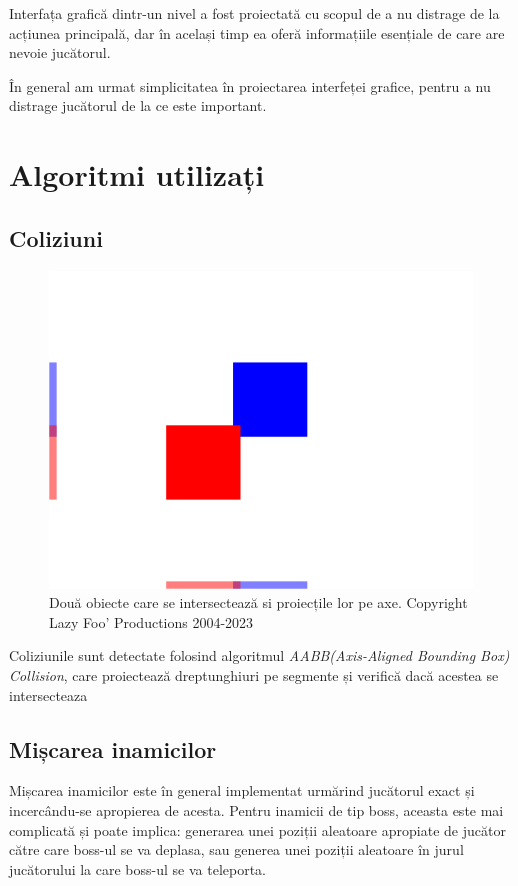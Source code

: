 \documentclass{article}
\begin{document}
    Interfața grafică dintr-un nivel a fost proiectată cu scopul de a nu distrage de
    la acțiunea principală, dar în același timp ea oferă informațiile esențiale de care are
    nevoie jucătorul.

    În general am urmat simplicitatea în proiectarea interfeței grafice, pentru a nu distrage
    jucătorul de la ce este important.

    \section{Algoritmi utilizați}

    \subsection{Coliziuni}
    \begin{figure}[H]
        \includegraphics[width=\linewidth]{collision.png}
        \caption{Două obiecte care se intersectează si proiecțile lor pe axe. Copyright Lazy Foo' Productions 2004-2023}
        \centering
    \end{figure}

    Coliziunile sunt detectate folosind algoritmul \emph{AABB(Axis-Aligned Bounding Box) Collision},
    care proiectează dreptunghiuri pe segmente și verifică dacă acestea se intersecteaza

    \subsection{Mișcarea inamicilor}

    Mișcarea inamicilor este în general implementat urmărind jucătorul exact și incercându-se
    apropierea de acesta. Pentru inamicii de tip boss, aceasta este mai complicată și poate
    implica: generarea unei poziții aleatoare apropiate de jucător către care boss-ul se va deplasa,
    sau generea unei poziții aleatoare în jurul jucătorului la care boss-ul se va teleporta.
\end{document}
